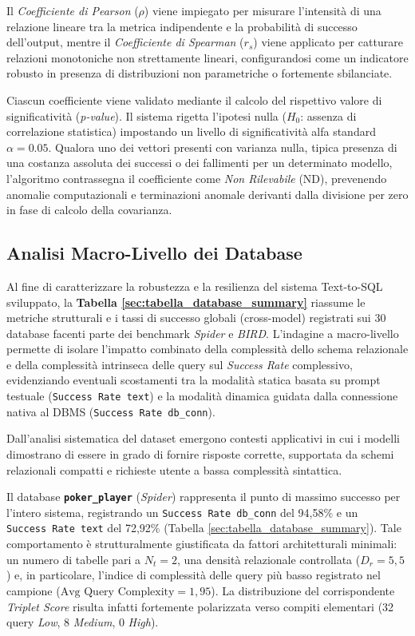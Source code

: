 Il \emph{Coefficiente di Pearson} (\(\rho\)) viene impiegato per
misurare l'intensità di una relazione lineare tra la metrica
indipendente e la probabilità di successo dell'output, mentre il
\emph{Coefficiente di Spearman} (\(r_s\)) viene applicato per catturare
relazioni monotoniche non strettamente lineari, configurandosi come un
indicatore robusto in presenza di distribuzioni non parametriche o
fortemente sbilanciate.

Ciascun coefficiente viene validato mediante il calcolo del rispettivo
valore di significatività (\emph{p-value}). Il sistema rigetta l'ipotesi
nulla (\(H_0\): assenza di correlazione statistica) impostando un
livello di significatività alfa standard \(\alpha = 0.05\). Qualora uno
dei vettori presenti con varianza nulla, tipica presenza di una
costanza assoluta dei successi o dei fallimenti per un determinato
modello, l'algoritmo contrassegna il coefficiente come \emph{Non
Rilevabile} (ND), prevenendo anomalie computazionali e terminazioni
anomale derivanti dalla divisione per zero in fase di calcolo della
covarianza.

\subsection{Analisi Macro-Livello dei
Database}\label{analisi-macro-livello-dei-database}

Al fine di caratterizzare la robustezza e la resilienza del sistema
Text-to-SQL sviluppato, la \textbf{Tabella \ref{sec:tabella_database_summary}} riassume le metriche
strutturali e i tassi di successo globali (cross-model)
registrati sui 30 database facenti parte dei benchmark \emph{Spider} e
\emph{BIRD}. L'indagine a macro-livello permette di isolare l'impatto
combinato della complessità dello schema relazionale e della complessità
intrinseca delle query sul \emph{Success Rate} complessivo, evidenziando
eventuali scostamenti tra la modalità statica basata su prompt
testuale (\texttt{Success\ Rate\ text}) e la modalità dinamica guidata
dalla connessione nativa al DBMS (\texttt{Success\ Rate\ db\_conn}).

Dall'analisi sistematica del dataset emergono contesti applicativi in
cui i modelli dimostrano di essere in grado di fornire risposte corrette, supportata
da schemi relazionali compatti e richieste utente a bassa complessità
sintattica.

Il database \textbf{\texttt{poker\_player}} (\emph{Spider}) rappresenta
il punto di massimo successo per l'intero sistema, registrando un
\texttt{Success\ Rate\ db\_conn} del 94,58\% e un
\texttt{Success\ Rate\ text} del 72,92\% (Tabella \ref{sec:tabella_database_summary}). Tale
comportamento è strutturalmente giustificata da fattori architetturali
minimali: un numero di tabelle pari a \(N_t = 2\), una densità
relazionale controllata (\(D_r = 5,5\)) e, in particolare, l'indice di
complessità delle query più basso registrato nel campione
(\(\text{Avg Query Complexity} = 1,95\)). La distribuzione del
corrispondente \emph{Triplet Score} risulta infatti fortemente
polarizzata verso compiti elementari (32 query \emph{Low}, 8 \emph{Medium},
0 \emph{High}).

